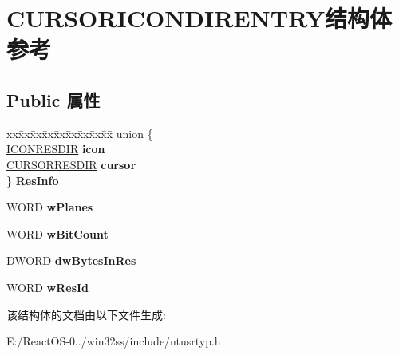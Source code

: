 \hypertarget{struct_c_u_r_s_o_r_i_c_o_n_d_i_r_e_n_t_r_y}{}\section{C\+U\+R\+S\+O\+R\+I\+C\+O\+N\+D\+I\+R\+E\+N\+T\+R\+Y结构体 参考}
\label{struct_c_u_r_s_o_r_i_c_o_n_d_i_r_e_n_t_r_y}
\subsection*{Public 属性}
\begin{DoxyCompactItemize}
\item 
\mbox{\label{struct_c_u_r_s_o_r_i_c_o_n_d_i_r_e_n_t_r_y_ad88548394ddfa121841670a937bcc154}} 
\begin{tabbing}
xx\=xx\=xx\=xx\=xx\=xx\=xx\=xx\=xx\=\kill
union \{\\
\>\hyperlink{struct_i_c_o_n_r_e_s_d_i_r}{ICONRESDIR} {\bfseries icon}\\
\>\hyperlink{struct_c_u_r_s_o_r_r_e_s_d_i_r}{CURSORRESDIR} {\bfseries cursor}\\
\} {\bfseries ResInfo}\\

\end{tabbing}\item 
\mbox{\label{struct_c_u_r_s_o_r_i_c_o_n_d_i_r_e_n_t_r_y_a2d4d85aa4e8c855a5edca4e09341200c}} 
W\+O\+RD {\bfseries w\+Planes}
\item 
\mbox{\label{struct_c_u_r_s_o_r_i_c_o_n_d_i_r_e_n_t_r_y_a9b54f8f2ec5831af32fe400eb4a7c8f8}} 
W\+O\+RD {\bfseries w\+Bit\+Count}
\item 
\mbox{\label{struct_c_u_r_s_o_r_i_c_o_n_d_i_r_e_n_t_r_y_ae5060964358293a16bbace88040a56de}} 
D\+W\+O\+RD {\bfseries dw\+Bytes\+In\+Res}
\item 
\mbox{\label{struct_c_u_r_s_o_r_i_c_o_n_d_i_r_e_n_t_r_y_ab9227736d9e5a6e3a27cc404d86690bc}} 
W\+O\+RD {\bfseries w\+Res\+Id}
\end{DoxyCompactItemize}


该结构体的文档由以下文件生成\+:\begin{DoxyCompactItemize}
\item 
E\+:/\+React\+O\+S-\/0../win32ss/include/ntusrtyp.\+h\end{DoxyCompactItemize}
